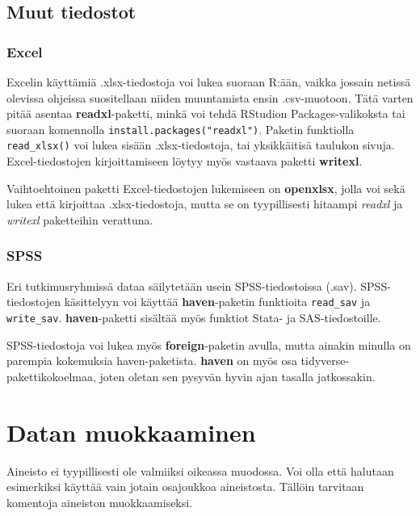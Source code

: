 \documentclass[
]{book}
\begin{document}
\hypertarget{muut-tiedostot}{%
\section{Muut tiedostot}\label{muut-tiedostot}}

\hypertarget{excel}{%
\subsection{Excel}\label{excel}}

Excelin käyttämiä .xlsx-tiedostoja voi lukea suoraan R:ään, vaikka jossain netissä olevissa ohjeissa suositellaan niiden muuntamista ensin .csv-muotoon. Tätä varten pitää asentaa \textbf{readxl}-paketti, minkä voi tehdä RStudion Packages-valikoksta tai suoraan komennolla \texttt{install.packages("readxl")}. Paketin funktiolla \texttt{read\_xlsx()} voi lukea sisään .xlsx-tiedostoja, tai yksikkäitisä taulukon sivuja. Excel-tiedostojen kirjoittamiseen löytyy myös vastaava paketti \textbf{writexl}.

Vaihtoehtoinen paketti Excel-tiedostojen lukemiseen on \textbf{openxlsx}, jolla voi sekä lukea että kirjoittaa .xlsx-tiedostoja, mutta se on tyypillisesti hitaampi \emph{readxl} ja \emph{writexl} paketteihin verattuna.

\hypertarget{spss}{%
\subsection{SPSS}\label{spss}}

Eri tutkimusryhmissä dataa säilytetään usein SPSS-tiedostoissa (.sav). SPSS-tiedostojen käsittelyyn voi käyttää \textbf{haven}-paketin funktioita \texttt{read\_sav} ja \texttt{write\_sav}. \textbf{haven}-paketti sisältää myös funktiot Stata- ja SAS-tiedostoille.

SPSS-tiedostoja voi lukea myös \textbf{foreign}-paketin avulla, mutta ainakin minulla on parempia kokemuksia haven-paketista. \textbf{haven} on myös osa tidyverse-pakettikokoelmaa, joten oletan sen pysyvän hyvin ajan tasalla jatkossakin.

\hypertarget{data-wrangling}{%
\chapter{Datan muokkaaminen}\label{data-wrangling}}

Aineisto ei tyypillisesti ole valmiiksi oikeassa muodossa. Voi olla että halutaan esimerkiksi käyttää vain jotain osajoukkoa aineistosta. Tällöin tarvitaan komentoja aineiston muokkaamiseksi.
\end{document}
